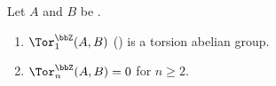 \begin{proposition} \label{proposition:tor_for_abelian_groups}
    Let $A$ and $B$ be .
    \begin{enumerate}
        \item $\Tor_1^\bbZ(A,B)$ () is a torsion abelian group. 
        \item $\Tor_n^\bbZ(A,B) = 0$ for $n \geq 2$. 
    \end{enumerate}
\end{proposition}